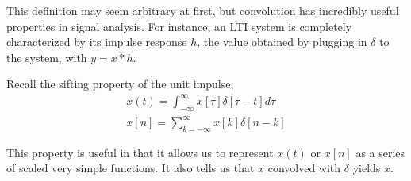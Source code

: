 This definition may seem arbitrary at first, but convolution has
incredibly useful properties in signal analysis. For instance, an
LTI system is completely characterized by its impulse response $h$,
the value obtained by plugging in $\delta$ to the system, with
$y = x * h$.

Recall the sifting property of the unit impulse,
\begin{align}
    x(t) = \int_{-\infty}^{\infty} x[\tau] \delta[\tau - t] d\tau \\
    x[n] = \sum_{k=-\infty}^{\infty} x[k] \delta[n - k]
\end{align}

This property is useful in that it allows us to represent
$x(t)$ or $x[n]$ as a series of scaled very simple functions. It also
tells us that $x$ convolved with $\delta$ yields $x$.